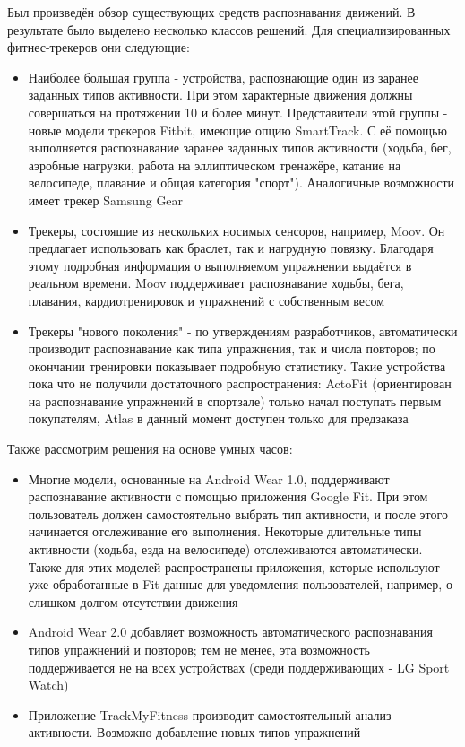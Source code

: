 Был произведён обзор существующих средств распознавания движений. В результате было выделено несколько классов решений. Для специализированных фитнес-трекеров они следующие:
\begin{itemize}
\item Наиболее большая группа - устройства, распознающие один из заранее заданных типов активности. При этом характерные движения должны совершаться на протяжении 10 и более минут. Представители этой группы - новые модели трекеров Fitbit, имеющие опцию SmartTrack. С её помощью выполняется распознавание заранее заданных типов активности (ходьба, бег, аэробные нагрузки, работа на эллиптическом тренажёре, катание на велосипеде, плавание и общая категория "спорт"). Аналогичные возможности имеет трекер Samsung Gear
\item Трекеры, состоящие из нескольких носимых сенсоров, например, Moov. Он предлагает использовать как браслет, так и нагрудную повязку. Благодаря этому подробная информация о выполняемом упражнении выдаётся в реальном времени. Moov поддерживает распознавание ходьбы, бега, плавания, кардиотренировок и упражнений с собственным весом
\item Трекеры "нового поколения" - по утверждениям разработчиков, автоматически производит распознавание как типа упражнения, так и числа повторов; по окончании тренировки показывает подробную статистику. Такие устройства пока что не получили достаточного распространения: ActoFit (ориентирован на распознавание упражнений в спортзале) только начал поступать первым покупателям, Atlas в данный момент доступен только для предзаказа
\end{itemize}

Также рассмотрим решения на основе умных часов:
\begin{itemize}
\item Многие модели, основанные на Android Wear 1.0, поддерживают распознавание активности с помощью приложения Google Fit. При этом пользователь должен самостоятельно выбрать тип активности, и после этого начинается отслеживание его выполнения. Некоторые длительные типы активности (ходьба, езда на велосипеде) отслеживаются автоматически. Также для этих моделей распространены приложения, которые используют уже обработанные в Fit данные для уведомления пользователей, например, о слишком долгом отсутствии движения
\item Android Wear 2.0 добавляет возможность автоматического распознавания типов упражнений и повторов; тем не менее, эта возможность поддерживается не на всех устройствах (среди поддерживающих - LG Sport Watch)
\item Приложение TrackMyFitness производит самостоятельный анализ активности. Возможно добавление новых типов упражнений 
\end{itemize}

